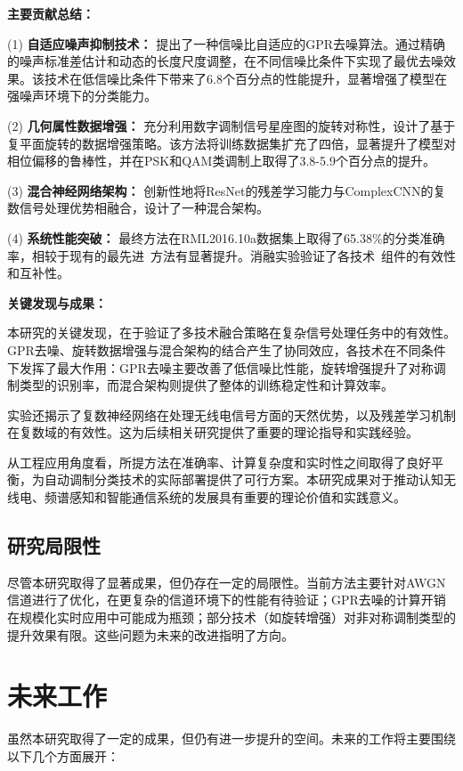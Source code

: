 \documentclass{article}
\begin{document}
\textbf{主要贡献总结：}

(1) \textbf{自适应噪声抑制技术：} 提出了一种信噪比自适应的GPR去噪算法。通过精确的噪声标准差估计和动态的长度尺度调整，在不同信噪比条件下实现了最优去噪效果。该技术在低信噪比条件下带来了6.8个百分点的性能提升，显著增强了模型在强噪声环境下的分类能力。

(2) \textbf{几何属性数据增强：} 充分利用数字调制信号星座图的旋转对称性，设计了基于复平面旋转的数据增强策略。该方法将训练数据集扩充了四倍，显著提升了模型对相位偏移的鲁棒性，并在PSK和QAM类调制上取得了3.8-5.9个百分点的提升。

(3) \textbf{混合神经网络架构：} 创新性地将ResNet的残差学习能力与ComplexCNN的复数信号处理优势相融合，设计了一种混合架构。

(4) \textbf{系统性能突破：} 最终方法在RML2016.10a数据集上取得了65.38\%的分类准确率，相较于现有的最先进~方法有显著提升。消融实验验证了各技术~组件的有效性和互补性。

\textbf{关键发现与成果：}

本研究的关键发现，在于验证了多技术融合策略在复杂信号处理任务中的有效性。GPR去噪、旋转数据增强与混合架构的结合产生了协同效应，各技术在不同条件下发挥了最大作用：GPR去噪主要改善了低信噪比性能，旋转增强提升了对称调制类型的识别率，而混合架构则提供了整体的训练稳定性和计算效率。

实验还揭示了复数神经网络在处理无线电信号方面的天然优势，以及残差学习机制在复数域的有效性。这为后续相关研究提供了重要的理论指导和实践经验。

从工程应用角度看，所提方法在准确率、计算复杂度和实时性之间取得了良好平衡，为自动调制分类技术的实际部署提供了可行方案。本研究成果对于推动认知无线电、频谱感知和智能通信系统的发展具有重要的理论价值和实践意义。

\subsection{研究局限性}

尽管本研究取得了显著成果，但仍存在一定的局限性。当前方法主要针对AWGN信道进行了优化，在更复杂的信道环境下的性能有待验证；GPR去噪的计算开销在规模化实时应用中可能成为瓶颈；部分技术（如旋转增强）对非对称调制类型的提升效果有限。这些问题为未来的改进指明了方向。

\section{未来工作}
虽然本研究取得了一定的成果，但仍有进一步提升的空间。未来的工作将主要围绕以下几个方面展开：
\end{document}
